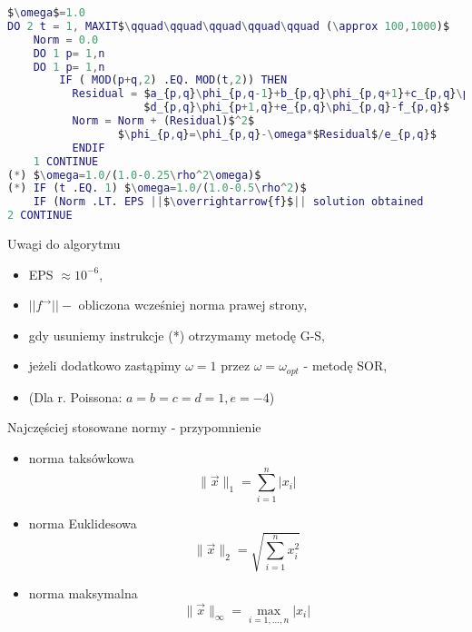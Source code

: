 \begin{frame}[fragile]{}
\begin{lstlisting}[language=Matlab, mathescape]
$\omega$=1.0
DO 2 t = 1, MAXIT$\qquad\qquad\qquad\qquad\qquad (\approx 100,1000)$
    Norm = 0.0
    DO 1 p= 1,n
    DO 1 p= 1,n
        IF ( MOD(p+q,2) .EQ. MOD(t,2)) THEN
          Residual = $a_{p,q}\phi_{p,q-1}+b_{p,q}\phi_{p,q+1}+c_{p,q}\phi_{p-1,q}+$
                     $d_{p,q}\phi_{p+1,q}+e_{p,q}\phi_{p,q}-f_{p,q}$
          Norm = Norm + (Residual)$^2$
                 $\phi_{p,q}=\phi_{p,q}-\omega*$Residual$/e_{p,q}$
          ENDIF
    1 CONTINUE
(*) $\omega=1.0/(1.0-0.25\rho^2\omega)$
(*) IF (t .EQ. 1) $\omega=1.0/(1.0-0.5\rho^2)$
    IF (Norm .LT. EPS ||$\overrightarrow{f}$|| solution obtained
2 CONTINUE
\end{lstlisting}
\end{frame}
\begin{frame}{}
  \begin{block}{Uwagi do algorytmu}
    \begin{itemize}
      \item EPS $\approx 10^{-6}$,
      \item $||f^\rightarrow|| -$ obliczona wcześniej norma prawej strony,
      \item gdy usuniemy instrukcje (*) otrzymamy metodę G-S,
      \item jeżeli dodatkowo zastąpimy $\omega=1$ przez $\omega=\omega_{opt}$ - metodę SOR,
      \item (Dla r. Poissona: $a=b=c=d=1, e=-4$)
    \end{itemize}
  \end{block}
\end{frame}
\begin{frame}{Najczęściej stosowane normy - przypomnienie}
\begin{itemize}
    \item  norma taksówkowa $$\|\vec{x}\|_1 = \sum_{i=1}^n |x_i|$$
\item norma Euklidesowa $$\|\vec{x}\|_2 = \sqrt{\sum_{i=1}^n x_i^2} $$
\item norma maksymalna 
$$\|\vec{x}\|_\infty = \max_{i=1,\dots,n} |x_i|$$
\end{itemize}
\end{frame}
